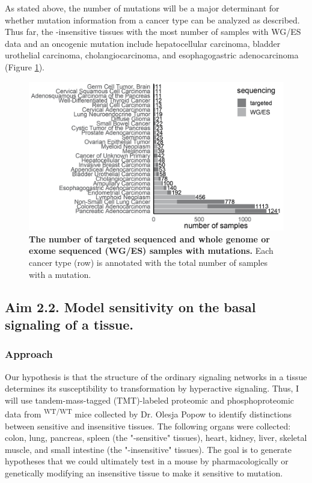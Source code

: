 As stated above, the number of \KRAS{} mutations will be a major determinant for whether mutation information from a cancer type can be analyzed as described.
Thus far, the \KRAS{}-insensitive tissues with the most number of samples with WG/ES data and an oncogenic \KRAS{} mutation include hepatocellular carcinoma, bladder urothelial carcinoma, cholangiocarcinoma, and esophagogastric adenocarcinoma (Figure \ref{fig:num-samples-kras-resistant}).

\begin{figure}[t!]
\centering
\includegraphics[width=120mm]{figures/aim2/kras-mutations-from-insensitive-tissues.jpg}
\caption{
    \textbf{The number of targeted sequenced and whole genome or exome sequenced (WG/ES) samples with \KRAS{} mutations.}
    Each cancer type (row) is annotated with the total number of samples with a \KRAS{} mutation.
}
\label{fig:num-samples-kras-resistant}
\end{figure}


\subsection*{Aim 2.2. Model \KRAS{} sensitivity on the basal signaling of a tissue.}

\subsubsection*{Approach}

Our hypothesis is that the structure of the ordinary signaling networks in a tissue determines its susceptibility to transformation by hyperactive \kras{} signaling.
Thus, I will use tandem-mass-tagged (TMT)-labeled \cite{Thompson2003} proteomic and phosphoproteomic data from \moKRAS{}\textsuperscript{WT/WT} mice collected by Dr. Olesja Popow to identify distinctions between sensitive and insensitive tissues.
The following organs were collected: colon, lung, pancreas, spleen (the "\KRAS{}-sensitive" tissues), heart, kidney, liver, skeletal muscle, and small intestine (the "\KRAS{}-insensitive" tissues).
The goal is to generate hypotheses that we could ultimately test in a mouse by pharmacologically or genetically modifying an insensitive tissue to make it sensitive to \KRAS{} mutation.

